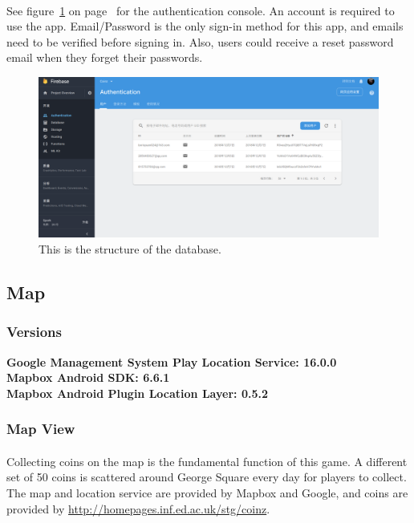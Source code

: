 \documentclass[12pt]{article}
\begin{document}
\paragraph{}
See figure~\ref{fig:auth} on page~\pageref{fig:auth} for the authentication console. An account is required to use the app. Email/Password is the only sign-in method for this app, and emails need to be verified before signing in. Also, users could receive a reset password email when they forget their passwords.
\begin{figure}
	\centering
	\includegraphics[scale=0.2]{Authentication.png}
	\caption{\label{fig:auth}This is the structure of the database.}
\end{figure}

\subsection{Map}
\subsubsection{Versions}
\hspace{12pt}\textbf{Google Management System Play Location Service: 16.0.0} \\
\null\hspace{12pt}\textbf{Mapbox Android SDK: 6.6.1} \\
\null\hspace{12pt}\textbf{Mapbox Android Plugin Location Layer: 0.5.2}
\subsubsection{Map View}
\paragraph{}
Collecting coins on the map is the fundamental function of this game. A different set of 50 coins is scattered around George Square every day for players to collect. The map and location service are provided by Mapbox and Google, and coins are provided by \href{http://homepages.inf.ed.ac.uk/stg/coinz}{http://homepages.inf.ed.ac.uk/stg/coinz}.
\end{document}
